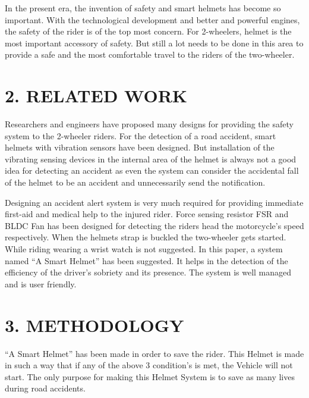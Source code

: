 In the present era, the invention of safety and smart helmets has become so important. With the technological development and better and powerful engines, the safety of the rider is of the top most concern. For 2-wheelers, helmet is the most important accessory of safety. But still a lot needs to be done in this area to provide a safe and the most comfortable travel to the riders of the two-wheeler.

\section*{2. RELATED WORK}
Researchers and engineers have proposed many designs for providing the safety system to the 2-wheeler riders. For the detection of a road accident, smart helmets with vibration sensors have been designed. But installation of the vibrating sensing devices in the internal area of the helmet is always not a good idea for detecting an accident as even the system can consider the accidental fall of the helmet to be an accident and unnecessarily send the notification.\vspace{.3cm}
 
Designing an accident alert system is very much required for providing immediate first-aid and medical help to the injured rider. Force sensing resistor {FSR} and BLDC Fan has been designed for detecting the riders head the motorcycle’s speed respectively. When the helmets strap is buckled the two-wheeler gets started. While riding wearing a wrist watch is not suggested. In this paper, a system named “A Smart Helmet” has been suggested.  It helps in the detection of the efficiency of the driver’s sobriety and its presence. The system is well managed and is user friendly.

\section*{3. METHODOLOGY}

“A Smart Helmet” has been made in order to save the rider. This Helmet is made in such a way that if any of the above 3 condition’s is met, the Vehicle will not start. The only purpose for making this Helmet System is to save as many lives during road accidents.\vspace{.3cm}

